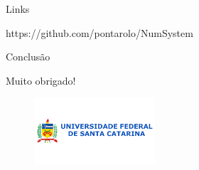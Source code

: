 \documentclass[11pt]{beamer}
\begin{document}
\begin{frame}{Links}
    \begin{center}
        https://github.com/pontarolo/NumSystem
    \end{center}
\end{frame}

\begin{frame}{Conclusão}
    \begin{center}
        Muito obrigado!
        \begin{figure}[htb]
        \centering
        \includegraphics[width=0.4\textwidth]{imagens/ufsc.png}
    \end{figure}
    \end{center}
\end{frame}
\end{document}
